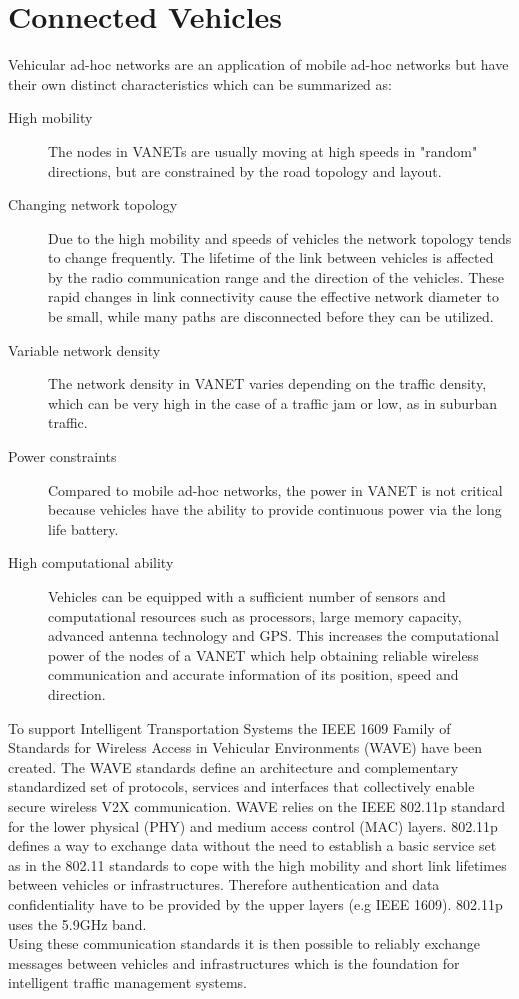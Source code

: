 \documentclass{sig-alternate}
\begin{document}
\section{Connected Vehicles}
Vehicular ad-hoc networks are an application of mobile ad-hoc networks but have their own distinct characteristics which can be summarized as\cite{al2014comprehensive}:
\begin{description}
\item[High mobility] The nodes in VANETs are usually moving at high speeds in "random" directions, but are constrained by the road topology and layout. 
\item[Changing network topology] Due to the high mobility and speeds of vehicles the network topology tends to change frequently. The lifetime of the link between vehicles is affected by the radio communication range and the direction of the vehicles. These rapid changes in link connectivity cause the effective network diameter to be small, while many paths are disconnected before they can be utilized.
\item[Variable network density] The network density in VANET varies depending on the traffic density, which can be very high in the case of a traffic jam or low, as in suburban traffic.
\item[Power constraints] Compared to mobile ad-hoc networks, the power in VANET is not critical because vehicles have the ability to provide continuous power via the long life battery. 
\item[High computational ability] Vehicles can be equipped with a sufficient number of sensors and computational resources such as processors, large memory capacity, advanced antenna technology and GPS. This increases the computational power of the nodes of a VANET which help obtaining reliable wireless communication and accurate information of its position, speed and direction.
\end{description}
To support Intelligent Transportation Systems the IEEE 1609 Family of Standards for Wireless Access in Vehicular Environments (WAVE) have been created. The WAVE standards define an architecture and complementary standardized set of protocols, services and interfaces that collectively enable secure wireless V2X communication. WAVE relies on the IEEE 802.11p standard for the lower physical (PHY) and medium access control (MAC) layers. 802.11p defines a way to exchange data without the need to establish a basic service set as in the 802.11 standards to cope with the high mobility and short link lifetimes between vehicles or infrastructures. Therefore authentication and data confidentiality have to be provided by the upper layers (e.g IEEE 1609). 802.11p uses the 5.9GHz band. \\
Using these communication standards it is then possible to reliably exchange messages between vehicles and infrastructures which is the foundation for intelligent traffic management systems. 
\end{document}

